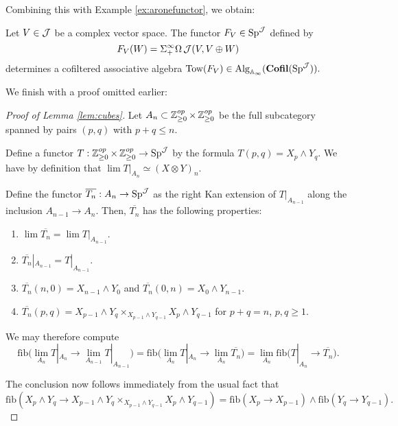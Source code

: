 Combining this with Example \ref{ex:aronefunctor}, we obtain:

\begin{cor}\label{cor:aronemonoidal}
Let $V\in \operatorname{\mathcal{J}}$ be a complex vector space.  
The functor $F_V\in \operatorname{\mathrm{Sp}}^{\operatorname{\mathcal{J}}}$ defined by $$F_V(W) = \Sigma^{\infty}_+ \Omega \operatorname{\mathcal{J}}(V, V\oplus W)$$ determines a cofiltered associative algebra $\text{Tow}(F_V) \in \operatorname{\mathrm{Alg}}_{\mathbb{A}_{\infty}}(\operatorname{\mathbf{Cofil}}(\operatorname{\mathrm{Sp}}^{\operatorname{\mathcal{J}}})).$
\end{cor}


We finish with a proof omitted earlier:
\begin{proof}[Proof of Lemma \ref{lem:cubes}]
Let $A_n\subset \operatorname{\mathbb{Z}}^{op}_{\geq 0} \times \operatorname{\mathbb{Z}}^{op}_{\geq 0} $ be the full subcategory spanned by pairs $(p,q)$ with $p+q \leq n$.  

Define a functor $T:\operatorname{\mathbb{Z}}^{op}_{\geq 0} \times \operatorname{\mathbb{Z}}^{op}_{\geq 0}  \to \operatorname{\mathrm{Sp}}^{\operatorname{\mathcal{J}}}$ by the formula $T(p,q) = X_p \wedge Y_q.$  We have by definition that $\lim T|_{A_n} \simeq (X\otimes Y)_{n}$.%

Define the functor $\overline{T_n}: A_n \to \operatorname{\mathrm{Sp}}^{\operatorname{\mathcal{J}}}$ as the right Kan extension of $T|_{A_{n-1}}$ along the inclusion $A_{n-1} \to A_{n}.$   Then, $\overline{T_n}$ has the following properties:
\begin{enumerate}
\item $\lim \overline{T_n} = \lim T|_{A_{n-1}}.$
\item $\overline{T_n}|_{A_{n-1}} = T|_{A_{n-1}}.$
\item $\overline{T_n}(n,0) = X_{n-1} \wedge Y_0$ and $\overline{T_n}(0,n) = X_0\wedge Y_{n-1}.$
\item $\overline{T_n}(p,q) = X_{p-1}\wedge Y_{q} \times_{X_{p-1}\wedge Y_{q-1}} X_p\wedge Y_{q-1}$ for $p+q=n$, $p,q\geq 1$.  
\end{enumerate}

We may therefore compute $$\text{fib}\big(\lim_{A_n} T|_{A_n} \to \lim_{A_{n-1}} T|_{A_{n-1}}\big) = \text{fib}\big(\lim_{A_n} T|_{A_n} \to \lim_{A_n} \overline{T_n}\big) = \lim_{A_n} \text{fib}\big(T|_{A_n} \to \overline{T_n}\big).$$

The conclusion now follows immediately from the usual fact that $$\text{fib}(X_p\wedge Y_q \to X_{p-1}\wedge Y_{q} \times_{X_{p-1}\wedge Y_{q-1}} X_p\wedge Y_{q-1}) = \text{fib}(X_p\to X_{p-1}) \wedge \text{fib}(Y_q \to Y_{q-1}).$$
\end{proof}

